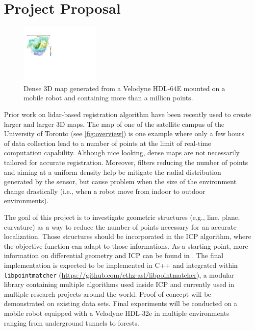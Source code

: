 \documentclass[10pt,letterpaper,oneside]{article}
\author{Fran\c{c}ois Pomerleau \\
       Laval University\\
       1065, av. de la Médecine \\
       Quebec, Qc \\
       Canada G1V 0A6 \\
       \texttt{<francois.pomerleau@ift.ulaval.ca>}
}
\begin{document}
\makeCustomTitle

\section*{Project Proposal}

\begin{figure}
\centering
\includegraphics[width=0.35\textwidth]{./figs/overview.pdf}
\caption{
Dense 3D map generated from a Velodyne HDL-64E mounted on a mobile robot and containing more than a million points.
}
\label{fig:overview}
\end{figure}

Prior work on lidar-based registration algorithm \cite{Pomerleau2014} have been recently used to create larger and larger 3D maps.
The map of one of the satellite campus of the University of Toronto (see \autoref{fig:overview}) is one example where only a few hours of data collection lead to a number of points at the limit of real-time computation capability.
Although nice looking, dense maps are not necessarily tailored for accurate registration.
Moreover, filters reducing the number of points and aiming at a uniform density help be mitigate the radial distribution generated by the sensor, but cause problem when the size of the environment change drastically (i.e., when a robot move from indoor to outdoor environments).

The goal of this project is to investigate geometric structures (e.g., line, plane, curvature) as a way to reduce the number of points necessary for an accurate localization.
Those structures should be incorporated in the \ac{ICP} algorithm, where the objective function can adapt to those informations.
As a starting point, more information on differential geometry and \ac{ICP} can be found in \cite{Pomerleau2015}.
The final implementation is expected to be implemented in C++ and integrated within \texttt{libpointmatcher} (\url{https://github.com/ethz-asl/libpointmatcher}), a modular library containing multiple algorithms used inside \ac{ICP} and currently used in multiple research projects around the world.
Proof of concept will be demonstrated on existing data sets.
Final experiments will be conducted on a mobile robot equipped with a Velodyne HDL-32e in multiple environments ranging from underground tunnels to forests.
\end{document}
